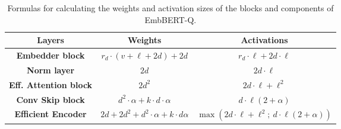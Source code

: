 \begin{table*}[t]
    \caption{Formulas for calculating the weights and activation sizes of the blocks and components of EmbBERT-Q.}
    \begin{center}
        \begin{tabular}{|c | c c|}
        \hline
        \textbf{Layers} & \textbf{Weights} & \textbf{Activations} \\
        \hline \hline
        \textbf{Embedder block}           & \(r_d \cdot (v + \ell + 2 d ) + 2 d\)
                                        & \(r_d \cdot \ell + 2 d \cdot \ell\) \\ \hline \hline
        \textbf{Norm layer}          & \(2 d\)
                                        & \(2 d \cdot \ell\) \\
        \textbf{Eff. Attention block}    & \(2 d^2 \) 
                                        & \(2 d \cdot \ell + \ell^2 \)\\
        \textbf{Conv Skip block}    & \(d^2 \cdot \alpha + k \cdot d \cdot \alpha\)
                                        & \(d \cdot \ell (2 + \alpha)\)\\
                                        \hline
        \textbf{Efficient Encoder} & \(2d + 2 d^2 + d^2 \cdot \alpha + k \cdot d \alpha\)
                                        & \(\max ( 2 d \cdot \ell + \ell^2 ; \  d \cdot \ell (2 + \alpha )) \)\\
        \hline
        \end{tabular}
    \end{center}
    \label{table:w&a_noMAMBA}
\end{table*}